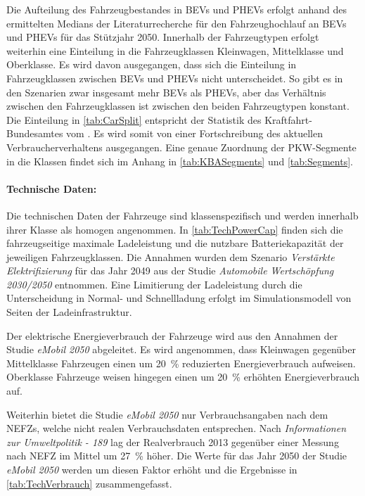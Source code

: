 Die Aufteilung des Fahrzeugbestandes in \glspl{BEV} und \glspl{PHEV} erfolgt anhand des ermittelten Medians der Literaturrecherche für den Fahrzeughochlauf an \glspl{BEV} und \glspl{PHEV} für das Stützjahr \num{2050}.
Innerhalb der Fahrzeugtypen erfolgt weiterhin eine Einteilung in die Fahrzeugklassen Kleinwagen, Mittelklasse und Oberklasse.
Es wird davon ausgegangen, dass sich die Einteilung in Fahrzeugklassen zwischen \glspl{BEV} und \glspl{PHEV} nicht unterscheidet.
So gibt es in den Szenarien zwar insgesamt mehr \glspl{BEV} als \glspl{PHEV}, aber das Verhältnis zwischen den Fahrzeugklassen ist zwischen den beiden Fahrzeugtypen konstant.
Die Einteilung in \autoref{tab:CarSplit} entspricht der Statistik des Kraftfahrt-Bundesamtes \cite{KBASegments2020} vom .
Es wird somit von einer Fortschreibung des aktuellen Verbraucherverhaltens ausgegangen.
Eine genaue Zuordnung der \gls{PKW}-Segmente in die Klassen findet sich im Anhang in \autoref{tab:KBASegments} und \autoref{tab:Segments}.




\paragraph{Technische Daten:}

Die technischen Daten der Fahrzeuge sind klassenspezifisch und werden innerhalb ihrer Klasse als homogen angenommen.
In \autoref{tab:TechPowerCap} finden sich die fahrzeugseitige maximale Ladeleistung und die nutzbare Batteriekapazität der jeweiligen Fahrzeugklassen.
Die Annahmen wurden dem Szenario \textit{Verstärkte Elektrifizierung} für das Jahr \num{2049} aus der Studie \textit{Automobile Wertschöpfung 2030/2050} \cite{Kaul2019} entnommen.
Eine Limitierung der Ladeleistung durch die Unterscheidung in Normal- und Schnellladung erfolgt im Simulationsmodell von Seiten der Ladeinfrastruktur.



Der elektrische Energieverbrauch der Fahrzeuge wird aus den Annahmen der Studie \textit{eMobil 2050} \cite{Hacker2014} abgeleitet.
Es wird angenommen, dass Kleinwagen gegenüber Mittelklasse Fahrzeugen einen um \SI{20}{\percent} reduzierten Energieverbrauch aufweisen.
Oberklasse Fahrzeuge weisen hingegen einen um \SI{20}{\percent} erhöhten Energieverbrauch auf.\medskip

Weiterhin bietet die Studie \textit{eMobil 2050} nur Verbrauchsangaben nach dem \glspl{NEFZ}, welche nicht realen Verbrauchsdaten entsprechen.
Nach \textit{Informationen zur Umweltpolitik - 189} \cite{Heinfellner2015} lag der Realverbrauch \num{2013} gegenüber einer Messung nach \gls{NEFZ} im Mittel um \SI{27}{\percent} höher.
Die Werte für das Jahr \num{2050} der Studie \textit{eMobil 2050} werden um diesen Faktor erhöht und die Ergebnisse in \autoref{tab:TechVerbrauch} zusammengefasst.

